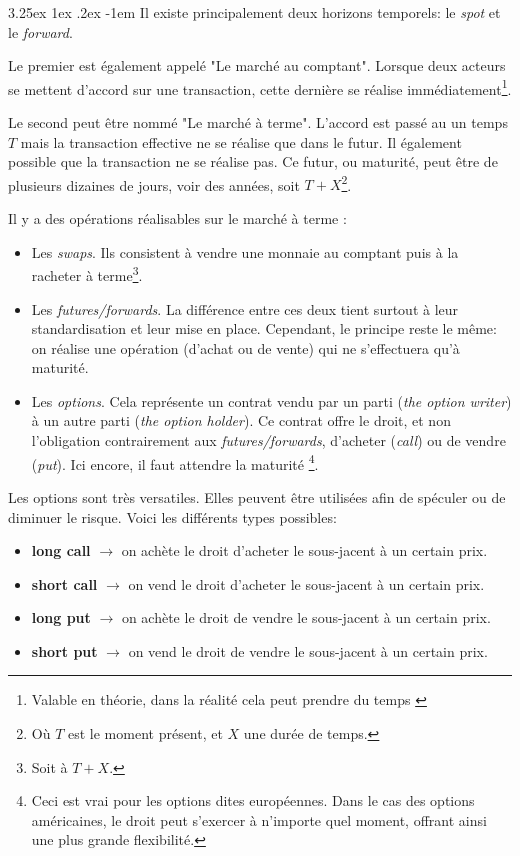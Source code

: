 \documentclass[a4paper, 11pt]{article}
\makeatletter
\renewcommand\paragraph{\@startsection{paragraph}{5}{\z@}%
  {3.25ex \@plus1ex \@minus.2ex}%
  {-1em}%
  {\normalfont\normalsize\bfseries}}
\makeatother
\begin{document}
\paragraph{}
Il existe principalement deux horizons temporels: le \textit{spot} et le \textit{forward}.

Le premier est également appelé "Le marché au comptant". Lorsque deux acteurs se mettent d'accord sur une transaction,
cette dernière se réalise 
immédiatement\footnote{Valable en théorie, dans la réalité cela peut prendre du temps \cite{marche_des_changes}}.

Le second peut être nommé "Le marché à terme". L'accord est passé au un temps $T$ mais la transaction effective ne
se réalise que dans le futur. Il également possible que la transaction ne se réalise pas. Ce futur, ou maturité, peut être de plusieurs dizaines de jours,
voir des années, soit $T + X$\footnote{Où $T$ est le moment présent, et $X$ une durée de temps.}.

Il y a des opérations réalisables sur le marché à terme :
\begin{itemize}
\item Les \textit{swaps}. Ils consistent à vendre une monnaie au comptant puis à la racheter à terme\footnote{Soit à $T+X$.}.

\item Les \textit{futures/forwards}. La différence entre ces deux tient surtout à leur standardisation et leur mise en place.
Cependant, le principe reste le même: on réalise une opération (d'achat ou de vente) qui ne s'effectuera qu'à maturité.

\item Les \textit{options}. Cela représente un contrat vendu par un parti (\textit{the option writer}) 
à un autre parti (\textit{the option holder}). Ce contrat offre le droit, et non l'obligation contrairement 
aux \textit{futures/forwards}, d'acheter (\textit{call}) ou de vendre (\textit{put}). Ici encore, il faut attendre la maturité
\footnote{Ceci est vrai pour les options dites européennes\cite{investopedia_option_europeenne}. 
Dans le cas des options américaines\cite{investopedia_option_americaine}, le droit peut s'exercer à n'importe quel moment, offrant
ainsi une plus grande flexibilité.}.
\end{itemize}

Les options sont très versatiles. Elles peuvent être utilisées afin de spéculer ou de diminuer le risque. Voici les différents types possibles:
\begin{itemize}
\item \textbf{long call} $\rightarrow$ on achète le droit d'acheter le sous-jacent à un certain prix.
\item \textbf{short call} $\rightarrow$ on vend le droit d'acheter le sous-jacent à un certain prix.
\item \textbf{long put} $\rightarrow$ on achète le droit de vendre le sous-jacent à un certain prix.
\item \textbf{short put} $\rightarrow$ on vend le droit de vendre le sous-jacent à un certain prix.
\end{itemize}
\end{document}
